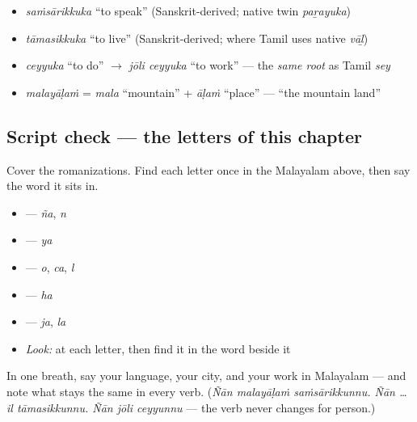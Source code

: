 \begin{cousinweb}
\begin{itemize}
\raggedright
  \item \emph{saṁsārikkuka} \textquotedblleft{}to speak\textquotedblright{} (Sanskrit-derived; native twin \emph{paṟayuka})
  \item \emph{tāmasikkuka} \textquotedblleft{}to live\textquotedblright{} (Sanskrit-derived; where Tamil uses native \emph{vāḻ})
  \item \emph{ceyyuka} \textquotedblleft{}to do\textquotedblright{} $\to$ \emph{jōli ceyyuka} \textquotedblleft{}to work\textquotedblright{} — the \emph{same root} as Tamil \emph{sey}
  \item \emph{malayāḷaṁ} = \emph{mala} \textquotedblleft{}mountain\textquotedblright{} + \emph{āḷaṁ} \textquotedblleft{}place\textquotedblright{} — \textquotedblleft{}the mountain land\textquotedblright{}
\end{itemize}
\end{cousinweb}

\subsection*{Script check — the letters of this chapter}
Cover the romanizations. Find each letter once in the Malayalam above, then say the word it sits in.

\begin{itemize}
\raggedright
  \item \textbf{} — \textbf{} \emph{ña}, \textbf{} \emph{n}
  \item \textbf{} — \textbf{} \emph{ya}
  \item \textbf{} — \textbf{} \emph{o}, \textbf{} \emph{ca}, \textbf{} \emph{l}
  \item \textbf{} — \textbf{} \emph{ha}
  \item \textbf{} — \textbf{} \emph{ja}, \textbf{} \emph{la}
\end{itemize}

\begin{itemize}
\raggedright
  \item \emph{Look:} at each letter, then find it in the word beside it
\end{itemize}

\begin{tcolorbox}[breakable,colback=teal!4,colframe=teal!35!black,title={Before you move on}]
In one breath, say your language, your city, and your work in Malayalam — and note what stays the same in every verb. (\emph{Ñān malayāḷaṁ saṁsārikkunnu. Ñān … il tāmasikkunnu. Ñān jōli ceyyunnu} — the verb never changes for person.)
\end{tcolorbox}
